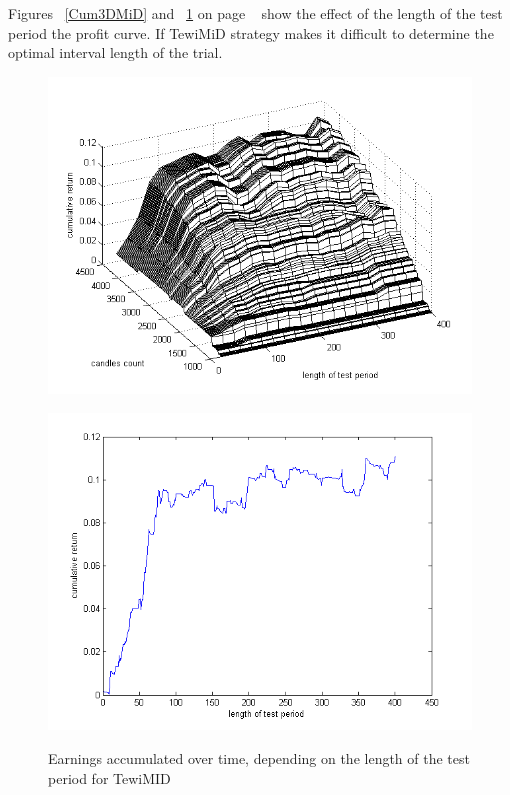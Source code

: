 \documentclass{tewiart}
\begin{document}

Figures ~\ref{Cum3DMiD} and ~\ref{Cum3DMiDend} on page ~\pageref{Cum3DMiDend} show the effect of the length of the test period the profit curve. If TewiMiD strategy makes it difficult to determine the optimal interval length of the trial.

\begin{figure}[h!]
\begin{minipage}{.45\linewidth}
\begin{center}
\includegraphics[width=\textwidth]{pictures/cumulativeReturnsD.png}
\label{Cum3DMiD}
\end{center}
\end{minipage}
\begin{minipage}{.45\linewidth}
\begin{center}
\includegraphics[width=\textwidth]{pictures/mid_end.png}
\label{Cum3DMiDend}
\end{center}
\end{minipage}
\caption{Earnings accumulated over time, depending on the length of the test period for TewiMID}
\end{figure}
\FloatBarrier
\end{document}
